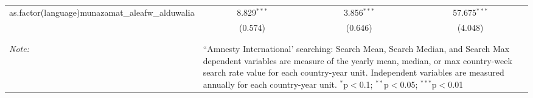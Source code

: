 \begin{table}[!htbp]
\begin{tabular}{@{\extracolsep{5pt}}lccc}
  as.factor(language)munazamat\_aleafw\_alduwalia & 8.829$^{***}$ & 3.856$^{***}$ & 57.675$^{***}$ \\ 
  & (0.574) & (0.646) & (4.048) \\ 
 \hline \\[-1.8ex] 
\hline 
\hline \\[-1.8ex] 
\textit{Note:}  & \multicolumn{3}{l}{\parbox[t]{8cm}{``Amnesty International' searching: Search Mean, Search Median, and Search Max dependent variables are measure of the yearly mean, median, or max country-week search rate value for each country-year unit. Independent variables are measured annually for each country-year unit. $^{*}$p$<$0.1; $^{**}$p$<$0.05; $^{***}$p$<$0.01}} \\ 
\end{tabular} 
\end{table} 
